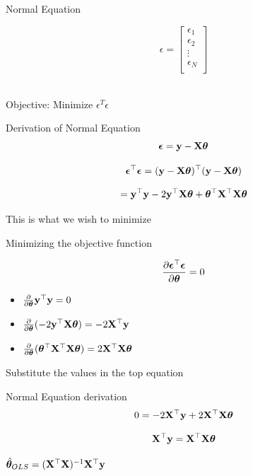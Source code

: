 \documentclass{beamer}
\begin{document}
\begin{frame}{Normal Equation}
    
\begin{equation*}
 \epsilon = 
\begin{bmatrix}
    \epsilon_{1} \\
    \epsilon_{2} \\
    \vdots \\
    \epsilon_{N} \\
\end{bmatrix}
\end{equation*}
\\
\begin{center}
 \pause Objective:   Minimize $\epsilon^{T}\epsilon$    
\end{center}
\end{frame}

\begin{frame}{Derivation of Normal Equation}
$$\boldsymbol{\epsilon} = \mathbf{y} - \mathbf{X}\boldsymbol{\theta}$$

$$\boldsymbol{\epsilon}^\top\boldsymbol{\epsilon} = (\mathbf{y} - \mathbf{X}\boldsymbol{\theta})^\top(\mathbf{y} - \mathbf{X}\boldsymbol{\theta})$$

$$= \mathbf{y}^\top\mathbf{y} - 2\mathbf{y}^\top\mathbf{X}\boldsymbol{\theta} + \boldsymbol{\theta}^\top\mathbf{X}^\top\mathbf{X}\boldsymbol{\theta}$$

This is what we wish to minimize
\end{frame}

\begin{frame}{Minimizing the objective function}
    
    
    $$\frac{\partial \boldsymbol{\epsilon}^\top \boldsymbol{\epsilon}}{\partial \boldsymbol{\theta}} = 0$$
    
    
    
    \begin{itemize}
        \item $\frac{\partial }{\partial \boldsymbol{\theta}} \mathbf{y}^\top\mathbf{y} = 0$
        \item $\frac{\partial }{\partial \boldsymbol{\theta}}(-2\mathbf{y}^\top\mathbf{X}\boldsymbol{\theta} ) = -2\mathbf{X}^\top\mathbf{y}$
        \item $\frac{\partial}{\partial\boldsymbol{\theta}} (\boldsymbol{\theta}^\top\mathbf{X}^\top\mathbf{X}\boldsymbol{\theta}) = 2\mathbf{X}^\top\mathbf{X}\boldsymbol{\theta}$
    \end{itemize}
    
    Substitute the values in the top equation
    
\end{frame}

\begin{frame}{Normal Equation derivation}
$$
    0 = -2\mathbf{X}^\top\mathbf{y} + 2\mathbf{X}^\top\mathbf{X}\boldsymbol{\theta}
$$

$$
    \mathbf{X}^\top\mathbf{y}  = \mathbf{X}^\top\mathbf{X}\boldsymbol{\theta}
$$

\begin{tcolorbox}
\begin{center}
        $\hat{\boldsymbol{\theta}}_{OLS} = (\mathbf{X}^\top\mathbf{X})^{-1}\mathbf{X}^\top\mathbf{y}$
\end{center}
\end{tcolorbox}

\end{frame}
\end{document}
